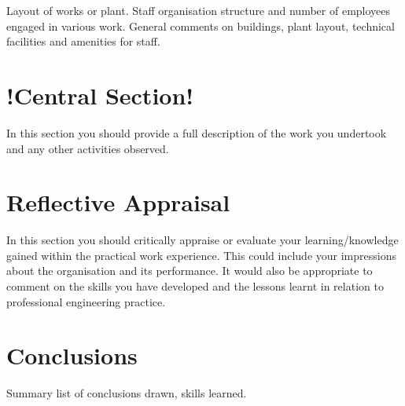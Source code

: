 \documentclass[pdftex, 12pt, a4paper, twoside]{article} %
\let\oldsection\section
\def\section{\cleardoublepage\oldsection}
\begin{document}
Layout of works or plant.
Staff organisation structure and number of employees engaged in various work.
General comments on buildings, plant layout, technical facilities and amenities for staff.
\lipsum[1-2]


\section{!Central Section!}
\label{sec:centralsection}
In this section you should provide a full description of the work you undertook and any other activities observed.
\lipsum[1-2]


\section{Reflective Appraisal}
\label{sec:reflectiveappraisal}
In this section you should critically appraise or evaluate your learning/knowledge gained within the practical work experience. This could include
your impressions about the organisation and its performance. It would also be appropriate to comment on the skills you have developed and the lessons learnt in relation to professional engineering practice.
\lipsum[1-2]


\section{Conclusions}
\label{sec:conclusions}
Summary list of conclusions drawn, skills learned.
\lipsum[1-2]

%
%

\end{document}
